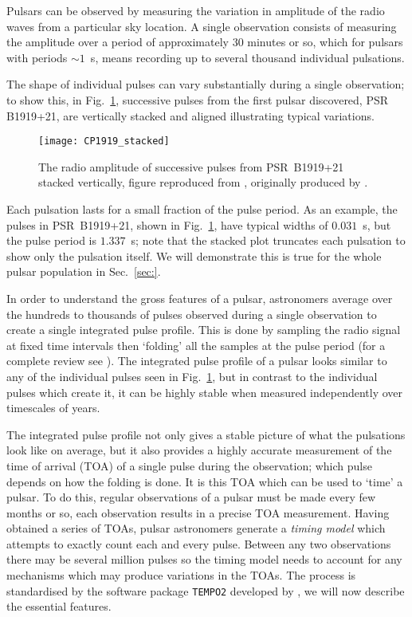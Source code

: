 Pulsars can be observed by measuring the variation in amplitude of the radio
waves from a particular sky location. A single observation consists of measuring
the amplitude over a period of approximately $30$ minutes or so, which for pulsars
with periods $\sim 1$~s, means recording up to several thousand individual pulsations.

The shape of individual pulses can vary substantially during a single
observation; to show this, in Fig.~\ref{fig: CP1919 stacked}, successive pulses
from the first pulsar discovered, PSR B1919+21, are vertically stacked and
aligned illustrating typical variations.
\begin{figure}[htb]
\centering
\texttt{[image: CP1919\_stacked]}
\caption{The radio amplitude of successive pulses from PSR~B1919+21 stacked
vertically, figure reproduced from \citet{mitton1977cambridge}, originally
produced by \citet{craft1970}.}
\label{fig: CP1919 stacked}
\end{figure}
Each pulsation lasts for a small fraction of the pulse period. As an example,
the pulses in PSR~B1919+21, shown in Fig.~\ref{fig: CP1919 stacked}, have
typical widths of $0.031$~s, but the pulse period is $1.337$~s; note that the
stacked plot truncates each pulsation to show only the pulsation itself. We will
demonstrate this is true for the whole pulsar population in
Sec.~\ref{sec:}.

In order to understand the gross features of a pulsar, astronomers average over
the hundreds to thousands of pulses observed during a single observation to
create a single integrated pulse profile. This is done by sampling the radio
signal at fixed time intervals then `folding' all the samples at the pulse
period (for a complete review see \citet{Lyne2012book}). The integrated pulse
profile of a pulsar looks similar to any of the individual pulses seen in
Fig.~\ref{fig: CP1919 stacked}, but in contrast to the individual pulses which
create it, it can be highly stable when measured independently over timescales
of years.

The integrated pulse profile not only gives a stable picture of what the
pulsations look like on average, but it also provides a highly accurate
measurement of the time of arrival (TOA) of a single pulse during the
observation; which pulse depends on how the folding is done. It is this TOA
which can be used to `time' a pulsar. To do this, regular observations of a
pulsar must be made every few months or so, each observation results in a
precise TOA measurement. Having obtained a series of TOAs, pulsar astronomers
generate a \emph{timing model} which attempts to exactly count each and every
pulse. Between any two observations there may be several million pulses so the
timing model needs to account for any mechanisms which may produce variations
in the TOAs.  The process is standardised by the software package
\texttt{TEMPO2} developed by \citet{Hobbs2006}, we will now describe the
essential features.

